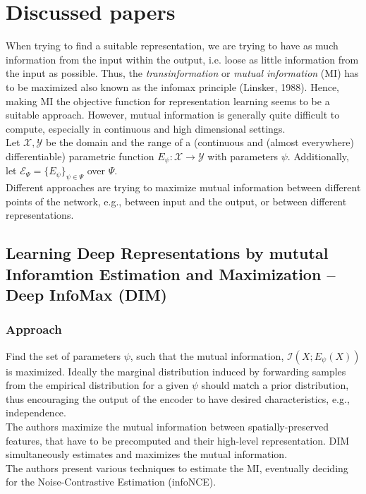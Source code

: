 \documentclass[]{article}
\begin{document}
\section{Discussed papers}
When trying to find a suitable representation, we are trying to have as much information from the input within the output, i.e. loose as little information from the input as possible. Thus, the \textit{transinformation} or \textit{mutual information} (MI) has to be maximized also known as the infomax principle (Linsker, 1988). Hence, making MI the objective function for representation learning seems to be a suitable approach. However,  mutual information is generally quite difficult to compute, especially in continuous and high dimensional settings.\\
Let $\mathcal{X}, \mathcal{Y}$ be the domain and the range of a (continuous and (almost everywhere) differentiable) parametric function
$E_\psi:\mathcal{X}\rightarrow\mathcal{Y}$ with parameters $\psi$. Additionally, let $\mathcal{E}_\Psi=\{E_\psi\}_{\psi\in\Psi}$ over $\Psi$. \\
Different approaches are trying to maximize mutual information between different points of the network, e.g., between input and the output, or between different representations.

\subsection{Learning Deep Representations by mututal Inforamtion Estimation and Maximization -- Deep InfoMax (DIM)}
\subsubsection{Approach}
Find the set of parameters $\psi$, such that the mutual information, $\mathcal{I}(X;E_\psi(X))$ is maximized. Ideally the marginal distribution induced by forwarding samples from the empirical distribution for a given $\psi$ should match a prior distribution, thus encouraging the output of the encoder to have desired characteristics, e.g., independence.\\
The authors maximize the mutual information between spatially-preserved features, that have to be precomputed and their high-level representation. DIM simultaneously estimates and maximizes the mutual information.\\

The authors present various techniques to estimate the MI, eventually deciding for the Noise-Contrastive Estimation (infoNCE).\\
\end{document}
